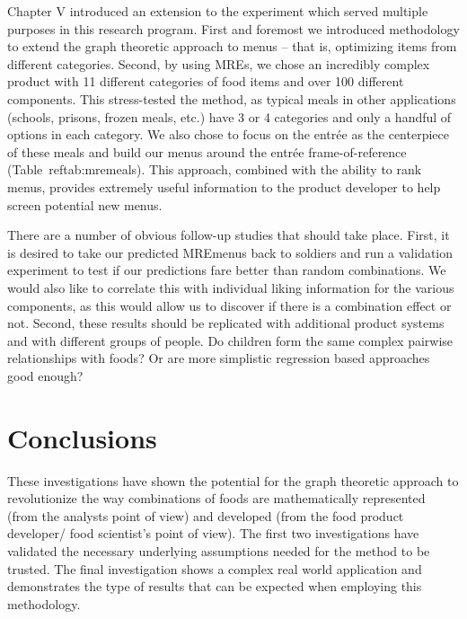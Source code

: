 Chapter V introduced an extension to the experiment which served multiple purposes in this research program.  First and foremost we introduced methodology to extend the graph theoretic approach to menus – that is, optimizing items from different categories.  Second, by using MREs\tm, we chose an incredibly complex product with 11 different categories of food items and over 100 different components.  This stress-tested the method, as typical meals in other applications (schools, prisons, frozen meals, etc.) have 3 or 4 categories and only a handful of options in each category.  We also chose to focus on the entrée as the centerpiece of these meals and build our menus around the entrée frame-of-reference (Table~ref{tab:mremeals}).  This approach, combined with the ability to rank menus, provides extremely useful information to the product developer to help screen potential new menus. 

There are a number of obvious follow-up studies that should take place.  First, it is desired to take our predicted MRE\tm menus back to soldiers and run a validation experiment to test if our predictions fare better than random combinations.  We would also like to correlate this with individual liking information for the various components, as this would allow us to discover if there is a combination effect or not.  Second, these results should be replicated with additional product systems and with different groups of people.  Do children form the same complex pairwise relationships with foods?  Or are more simplistic regression based approaches good enough?  

\section{Conclusions}
These investigations have shown the potential for the graph theoretic approach to revolutionize the way combinations of foods are mathematically represented (from the analysts point of view) and developed (from the food product developer/ food scientist’s point of view).  The first two investigations have validated the necessary underlying assumptions needed for the method to be trusted.  The final investigation shows a complex real world application and demonstrates the type of results that can be expected when employing this methodology. 
